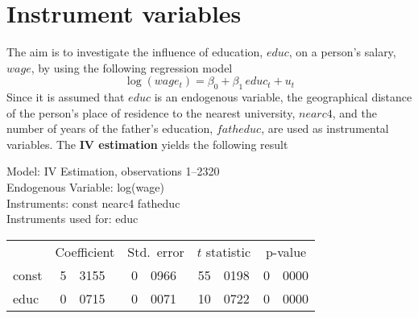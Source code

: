 \documentclass{article}
\begin{document}
\section{Instrument variables}
The aim is to investigate the influence of education, $educ$, on a person's salary, $wage$, by using the following regression model
\[\log(wage_t) = \beta_0 + \beta_1\, educ_t + u_t\]
Since it is assumed that $educ$ is an endogenous variable, the geographical distance of the person's place of residence to the nearest university, $nearc4$, and the number of years of the father's education, $fatheduc$, are used as instrumental variables. The \textbf{IV estimation} yields the following result

\renewcommand{\arraystretch}{0.8}
\begin{center}
	
	Model: IV Estimation, observations 1--2320\\
	Endogenous Variable: log(wage)\\
	Instruments: const nearc4 fatheduc \\
	Instruments used for: educ \\	
	\vspace{1em}
	
	\begin{tabular}{lr@{,}lr@{,}lr@{,}lr@{,}l}
		&
		\multicolumn{2}{c}{Coefficient} &
		\multicolumn{2}{c}{Std.\ error} &
		\multicolumn{2}{c}{$t$ statistic} &
		\multicolumn{2}{c}{p-value} \\[1ex]
		const &
		5&3155 &
		0&0966 &
		55&0198 &
		0&0000 \\
		educ &
		0&0715 &
		0&0071 &
		10&0722 &
		0&0000 \\
	\end{tabular}
	
	\vspace{1em}
	
\end{center}

\renewcommand{\arraystretch}{1.5}
\end{document}
